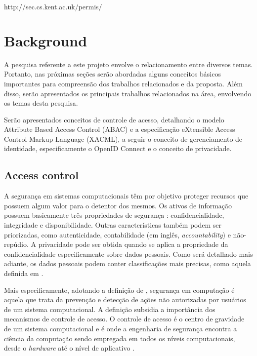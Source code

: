 \documentclass{doublecol-new}
\begin{document}
http://sec.cs.kent.ac.uk/permis/

\section{Background}
A pesquisa referente a este projeto envolve o relacionamento entre diversos temas. Portanto, nas próximas seções serão abordadas alguns conceitos básicos importantes para compreensão dos trabalhos relacionados e da proposta. Além disso, serão apresentados os principais trabalhos relacionados na área, envolvendo os temas desta pesquisa. 

Serão apresentados conceitos de controle de acesso, detalhando o modelo Attribute Based Access Control (ABAC)\cite{huABAC2014guide} e a especificação eXtensible Access Control Markup Language (XACML)\cite{rissanen2013extensible}, a seguir o conceito de gerenciamento de identidade, especificamente o OpenID Connect e o conceito de privacidade.


\subsection{Access control}
A segurança em sistemas computacionais têm por objetivo proteger recursos que possuem algum valor para o detentor dos mesmos. Os ativos de informação possuem basicamente três propriedades de segurança \cite{gollmann2011compsecurity}: confidencialidade, integridade e disponibilidade. Outras características também podem ser priorizadas, como autenticidade, contabilidade (em inglês, \textit{accountability}) e não-repúdio. A privacidade pode ser obtida quando se aplica a propriedade da confidencialidade especificamente sobre dados pessoais. Como será detalhado mais adiante, os dados pessoais podem conter classificações mais precisas, como aquela definida em \cite{heurix2015taxonomy}.

Mais especificamente, adotando a definição de  \cite{gollmann2011compsecurity}, segurança em computação é aquela que trata da prevenção e detecção de ações não autorizadas por usuários de um sistema computacional. A definição subsidia a importância dos mecanismos de controle de acesso. O controle de acesso é o centro de gravidade de um sistema computacional e é onde a engenharia de segurança encontra a ciência da computação sendo empregada em todos os níveis computacionais, desde o \textit{hardware} até o nível de aplicativo \cite{anderson2008security}.
\end{document}
